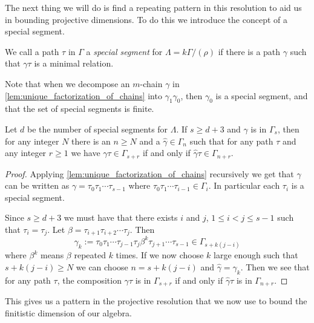 The next thing we will do is find a repeating pattern in this resolution to aid us in bounding projective dimensions. To do this we introduce the concept of a special segment.

\begin{defn}
	We call a path $\tau$ in $\Gamma$ a \emph{special segment} for $\Lambda = k\Gamma/(\rho)$ if there is a path $\gamma$ such that $\gamma\tau$ is a minimal relation.
\end{defn}

Note that when we decompose an $m$-chain $\gamma$ in \cref{lem:unique_factorization_of_chains} into $\gamma_1\gamma_0$, then $\gamma_0$ is a special segment, and that the set of special segments is finite.

\begin{lemma}\cite[Theorem~2.2]{GKK91}\label{lem:monomial_relation_repetition}
	Let $d$ be the number of special segments for $\Lambda$. If $s \geq d+3$ and $\gamma$ is in $\Gamma_s$, then for any integer $N$ there is an $n \geq N$ and a $\hat{\gamma} \in \Gamma_n$ such that for any path $\tau$ and any integer $r \geq 1$ we have $\gamma\tau \in \Gamma_{s+r}$ if and only if $\hat{\gamma}\tau \in \Gamma_{n+r}$.
	\begin{proof}
		Applying \cref{lem:unique_factorization_of_chains} recursively we get that $\gamma$ can be written as $\gamma = \tau_0\tau_1\cdots \tau_{s-1}$ where $\tau_0\tau_1 \cdots \tau_{i-1} \in \Gamma_i$. In particular each $\tau_i$ is a special segment.
		
		Since $s \geq d+3$ we must have that there exists $i$ and $j$, $1\leq i < j \leq s-1$ such that $\tau_i=\tau_j$. Let $\beta = \tau_{i+1}\tau_{i+2}\cdots\tau_j$. Then $$\gamma_k := \tau_0\tau_1\cdots\tau_{j-1}\tau_j\beta^k\tau_{j+1}\cdots\tau_{s-1} \in \Gamma_{s + k(j-i)}$$
		where $\beta^k$ means $\beta$ repeated $k$ times. If we now choose $k$ large enough such that $s+k(j-i) \geq N$ we can choose $n=s+k(j-i)$ and $\hat{\gamma}=\gamma_k$. Then we see that for any path $\tau$, the composition $\gamma\tau$ is in $\Gamma_{s+r}$ if and only if $\hat{\gamma}\tau$ is in $\Gamma_{n+r}$.
	\end{proof}
\end{lemma}

This gives us a pattern in the projective resolution that we now use to bound the finitistic dimension of our algebra.

